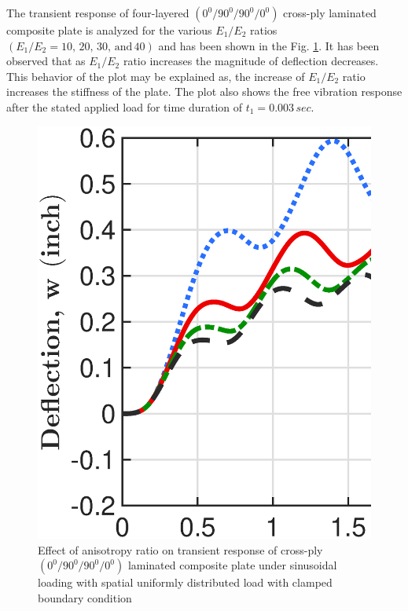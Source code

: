 \documentclass[3p,preprint,12pt]{elsarticle}
\begin{document}
The transient response of four-layered $(0^{0}/90^{0}/90^{0}/0^{0})$ cross-ply laminated composite plate is analyzed for the various $E_{1}/E_{2}$ ratios $(E_{1}/E_{2}=10,\,20,\,30,\,\text{and}\,40)$ and has been shown in the Fig. \ref{tran_E1_E2_study}. It has been observed that as $E_{1}/E_{2}$ ratio increases the magnitude of deflection decreases. This behavior of the plot may be explained as, the increase of $E_{1}/E_{2}$ ratio increases the stiffness of the plate. The plot also shows the free vibration response after the stated applied load for time duration of $t_{1}=0.003\,sec$.

\begin{figure}
	\begin{centering}
		\graphicspath{{./All_Images/}}
		\includegraphics[scale=0.3]{4_Layered_Sym_Cross_Ply_E1_E2.eps}
		\par\end{centering}
	\caption{Effect of anisotropy ratio on transient response of cross-ply $(0^{0}/90^{0}/90^{0}/0^{0})$
		laminated composite plate under sinusoidal loading with spatial uniformly distributed load with clamped boundary condition}
	\label{tran_E1_E2_study}
\end{figure}
\end{document}
